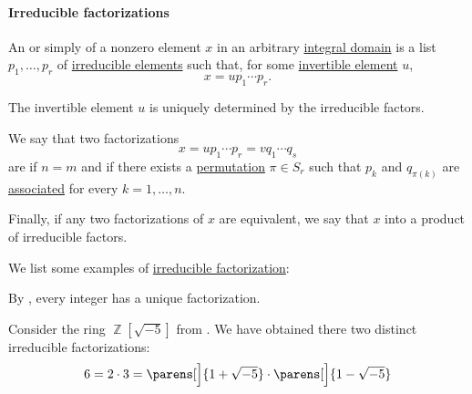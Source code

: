 \paragraph{Irreducible factorizations}

\begin{definition}\label{def:irreducible_factorization}
  An  or simply  of a nonzero element \( x \) in an arbitrary \hyperref[def:integral_domain]{integral domain} is a list \( p_1, \ldots, p_r \) of \hyperref[def:domain_divisibility/irreducible]{irreducible elements} such that, for some \hyperref[def:divisibility/invertible]{invertible element} \( u \),
  \begin{equation*}
    x = u p_1 \cdots p_r.
  \end{equation*}

  The invertible element \( u \) is uniquely determined by the irreducible factors.

  \begin{thmenum}
     We say that two factorizations
    \begin{equation*}
      x = u p_1 \cdots p_r = v q_1 \cdots q_s
    \end{equation*}
    are  if \( n = m \) and if there exists a \hyperref[def:symmetric_group]{permutation} \( \pi \in S_r \) such that \( p_k \) and \( q_{\pi(k)} \) are \hyperref[def:domain_divisibility/associates]{associated} for every \( k = 1, \ldots, n \).

     Finally, if any two factorizations of \( x \) are equivalent, we say that \( x \)  into a product of irreducible factors.
  \end{thmenum}
\end{definition}

\begin{example}\label{ex:def:irreducible_factorization}
  We list some examples of \hyperref[def:irreducible_factorization]{irreducible factorization}:
  \begin{thmenum}
     By , every integer has a unique factorization.

     Consider the ring \( \BbbZ[\sqrt{-5}] \) from . We have obtained there two distinct irreducible factorizations:
    \begin{equation*}
      6 = 2 \cdot 3 = \parens[\Big]{ 1 + \sqrt{-5} } \cdot \parens[\Big]{ 1 - \sqrt{-5}}
    \end{equation*}
  \end{thmenum}
\end{example}

